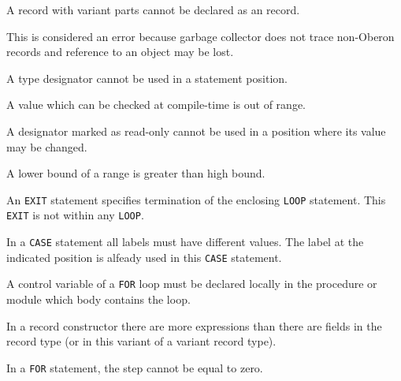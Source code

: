
A record with variant parts cannot be declared as an \ot{} record.


This is considered an error because garbage collector does not trace
non-Oberon records and reference to an object may be lost.


A type designator cannot be used in a statement position.


A value which can be checked at compile-time is out of range.


A designator marked as read-only cannot be used in a position where
its value may be changed.


A lower bound of a range is greater than high bound.


An \verb'EXIT' statement specifies termination of the enclosing \verb'LOOP' statement.
This \verb'EXIT' is not within any \verb'LOOP'.


In a \verb'CASE' statement all labels must have different values.
The label at the indicated position is alfeady used in this \verb'CASE'
statement.


A control variable of a \verb'FOR' loop must be declared locally
in the procedure or module which body contains the loop.


In a record constructor there are more expressions than there are fields
in the record type (or in this variant of a variant record type).


In a \verb'FOR' statement, the step cannot be equal to zero.


